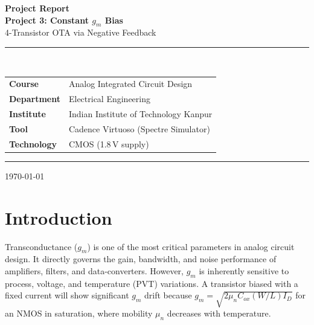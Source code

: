 \documentclass[12pt,a4paper]{article}
\begin{document}
\begin{titlepage}
  \centering
  \vspace*{1.5cm}

  {\Huge\bfseries\color{headerblue} Project Report}\\[0.5cm]
  {\LARGE\bfseries Project 3: Constant $g_m$ Bias}\\[0.3cm]
  {\large 4-Transistor OTA via Negative Feedback}\\[1.2cm]

  \rule{\linewidth}{0.5pt}\\[0.5cm]

  \begin{tabular}{ll}
    \textbf{Course}      & Analog Integrated Circuit Design \\[4pt]
    \textbf{Department}  & Electrical Engineering \\[4pt]
    \textbf{Institute}   & Indian Institute of Technology Kanpur \\[4pt]
    \textbf{Tool}        & Cadence Virtuoso (Spectre Simulator) \\[4pt]
    \textbf{Technology}  & CMOS (1.8\,V supply) \\
  \end{tabular}

  \vspace{1cm}
  \rule{\linewidth}{0.5pt}

  \vfill
  {\large \today}
\end{titlepage}

\tableofcontents
\newpage

\section{Introduction}

Transconductance ($g_m$) is one of the most critical parameters in analog circuit design. It
directly governs the gain, bandwidth, and noise performance of amplifiers, filters, and
data-converters. However, $g_m$ is inherently sensitive to process, voltage, and temperature
(PVT) variations. A transistor biased with a fixed current will show significant $g_m$ drift
because $g_m = \sqrt{2\mu_n C_{ox}(W/L)I_D}$ for an NMOS in saturation, where mobility
$\mu_n$ decreases with temperature.
\end{document}
